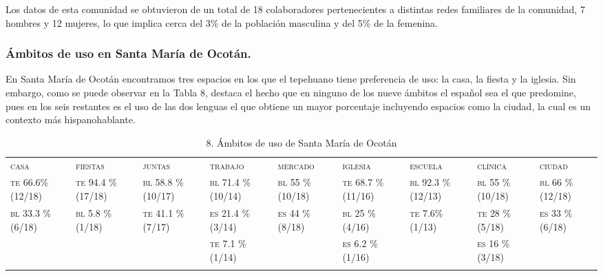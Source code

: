 \documentclass[output=paper]{../langscibook}
\begin{document}
Los datos de esta comunidad se obtuvieron de un total de 18 colaboradores pertenecientes a distintas redes familiares de la comunidad, 7 hombres y 12 mujeres, lo que implica cerca del 3\% de la población masculina y del 5\% de la femenina.


 \subsubsection{Ámbitos de uso en Santa María de Ocotán.}


En Santa María de Ocotán encontramos tres espacios en los que el tepehuano tiene preferencia de uso: la casa, la fiesta y la iglesia. Sin embargo, como se puede observar en la Tabla 8, destaca el hecho que en ninguno de los nueve ámbitos el español sea el que predomine, pues en los seis restantes es el uso de las dos lenguas el que obtiene un mayor porcentaje incluyendo espacios como la ciudad, la cual es un contexto más hispanohablante.

\begin{table}
\caption{\label{tab:guerrero}8. Ámbitos de uso de Santa María de Ocotán}
\begin{tabularx}{\textwidth}{XXXXXXXXX}
\lsptoprule
{\textsc{casa}} & {\textsc{fiestas}} & {\textsc{juntas}} & {\textsc{trabajo}} & {\textsc{mercado}} & {\textsc{iglesia}} & {\textsc{escuela}} & {\textsc{clínica}} & {\textsc{ciudad}}\\
{\textsc{te} \textsc{66.6\%} \textsc{(12/18)}} & {\textsc{te} \textsc{94.4} \textsc{\%} \textsc{(17/18)}} & {\textsc{bl} \textsc{58.8} \textsc{\%} \textsc{(10/17)}} & {\textsc{bl} \textsc{71.4} \textsc{\%} \textsc{(10/14)}} & {\textsc{bl} \textsc{55} \textsc{\%} \textsc{(10/18)}} & {\textsc{te} \textsc{68.7} \textsc{\%} \textsc{(11/16)}} & {\textsc{bl} \textsc{92.3} \textsc{\%} \textsc{(12/13)}} & {\textsc{bl} \textsc{55} \textsc{\%} \textsc{(10/18)}} & {\textsc{bl} \textsc{66} \textsc{\%} \textsc{(12/18)}}\\
{\textsc{bl} \textsc{33.3} \textsc{\%} \textsc{(6/18)}} & {\textsc{bl} \textsc{5.8} \textsc{\%} \textsc{(1/18)}} & {\textsc{te} \textsc{41.1} \textsc{\%} \textsc{(7/17)}} & {\textsc{es} \textsc{21.4} \textsc{\%} \textsc{(3/14)}} & {\textsc{es} \textsc{44} \textsc{\%} \textsc{(8/18)}} & {\textsc{bl} 25 \% (4/16)} & {\textsc{te} \textsc{7.6\%} \textsc{(1/13)}} & {\textsc{te} \textsc{28} \textsc{\%} \textsc{(5/18)}} & {\textsc{es} \textsc{33} \textsc{\%} \textsc{(6/18)}}\\
&  &  & {\textsc{te} \textsc{7.1} \textsc{\%} \textsc{(1/14)}} &  & {\textsc{es} \textsc{6.2} \textsc{\%} \textsc{(1/16)}} &  & {\textsc{es} 16 \% (3/18)} & \\
\lspbottomrule
\end{tabularx}
\end{table}
\end{document}
